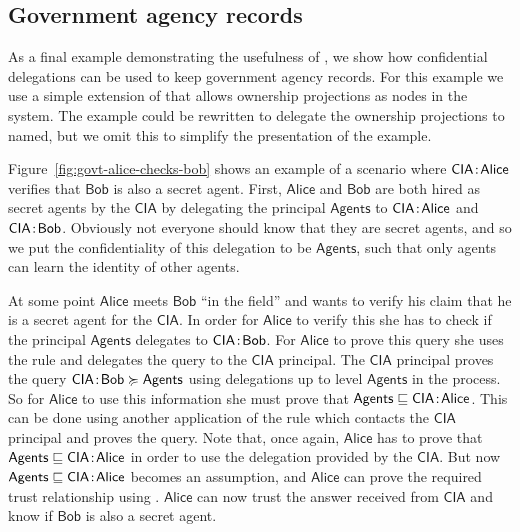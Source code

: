 \subsection{Government agency records}
As a final example demonstrating the usefulness of \lang, we show how confidential delegations can be used to keep government agency records. For this example we use a simple extension of \lang{} that allows ownership projections as nodes in the system. The example could be rewritten to delegate the ownership projections to named, but we omit this to simplify the presentation of the example.

Figure~\ref{fig:govt-alice-checks-bob} shows an example of a scenario where $\mathsf{CIA}\!:\!\mathsf{Alice}$ verifies that $\mathsf{Bob}$ is also a secret agent. First, $\mathsf{Alice}$ and $\mathsf{Bob}$ are both hired as secret agents by the $\mathsf{CIA}$ by delegating the principal $\mathsf{Agents}$ to $\mathsf{CIA}\!:\!\mathsf{Alice}$ and $\mathsf{CIA}\!:\!\mathsf{Bob}$. Obviously not everyone should know that they are secret agents, and so we put the confidentiality of this delegation to be $\mathsf{Agents}$, such that only agents can learn the identity of other agents.

At some point $\mathsf{Alice}$ meets $\mathsf{Bob}$ ``in the field'' and wants to verify his claim that he is a secret agent for the $\mathsf{CIA}$. In order for $\mathsf{Alice}$ to verify this she has to check if the principal $\mathsf{Agents}$ delegates to $\mathsf{CIA}\!:\!\mathsf{Bob}$. For $\mathsf{Alice}$ to prove this query she uses the  rule and delegates the query to the $\mathsf{CIA}$ principal. The $\mathsf{CIA}$ principal proves the query $\mathsf{CIA}\!:\!\mathsf{Bob} \succcurlyeq \mathsf{Agents}$ using delegations up to level $\mathsf{Agents}$ in the process. So for $\mathsf{Alice}$ to use this information she must prove that $\mathsf{Agents} \sqsubseteq \mathsf{CIA}\!:\!\mathsf{Alice}$. This can be done using another application of the  rule which contacts the $\mathsf{CIA}$ principal and proves the query. Note that, once again, $\mathsf{Alice}$ has to prove that $\mathsf{Agents} \sqsubseteq \mathsf{CIA}\!:\!\mathsf{Alice}$ in order to use the delegation provided by the $\mathsf{CIA}$. But now $\mathsf{Agents} \sqsubseteq \mathsf{CIA}\!:\!\mathsf{Alice}$ becomes an assumption, and $\mathsf{Alice}$ can prove the required trust relationship using .
$\mathsf{Alice}$ can now trust the answer received from $\mathsf{CIA}$ and know if $\mathsf{Bob}$ is also a secret agent.

